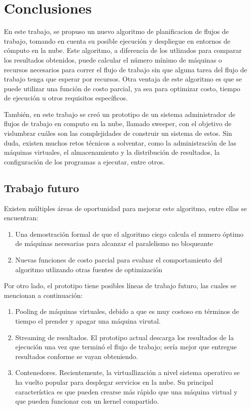 \chapter{Conclusiones}
\label{chap:conclusions}

En este trabajo, se propuso un nuevo algoritmo de planificacion de flujos de trabajo, tomando en cuenta su posible ejecución y despliegue en entornos de cómputo en la nube. Este algoritmo, a diferencia de los utlizados para comparar los resultados obtenidos, puede calcular el número mínimo de máquinas o recursos necesarios para correr el flujo de trabajo sin que alguna tarea del flujo de trabajo tenga que esperar por recursos. Otra ventaja de este algoritmo es que se puede utilizar una funci\'on de costo parcial, ya sea para optimizar costo, tiempo de ejecuci\'on u otros requisitos espec\'ificos.

Tambi\'en, en este trabajo se cre\'o un prototipo de un sistema administrador de flujos de trabajo en computo en la nube, llamado sweeper, con el objetivo de vislumbrar cu\'ales son las complejidades de construir un sistema de estos. Sin duda, existen muchos retos t\'ecnicos a solventar, como la administraci\'on de las m\'aquinas virtuales, el almacenamiento y la distribuci\'on de resultados, la configuraci\'on de los programas a ejecutar, entre otros.


\section{Trabajo futuro}

Existen múltiples áreas de oportunidad para mejorar este algoritmo, entre ellas se encuentran:

\begin{enumerate}
\item{Una demostraci\'on formal de que el algoritmo ciego calcula el numero \'optimo de m\'aquinas necesarias para alcanzar el paralelismo no bloqueante}
\item{Nuevas funciones de costo parcial para evaluar el comportamiento del algoritmo utlizando otras fuentes de optimizaci\'on}
\end{enumerate}

Por otro lado, el prototipo tiene posibles l\'ineas de trabajo futuro, las cuales se mencionan a continuaci\'on:

\begin{enumerate}
\item{Pooling de m\'aquinas virtuales, debido a que es muy costoso en t\'erminos de tiempo el prender y apagar una m\'aquina virutal.}
\item{Streaming de resultados. El prototipo actual descarga los resultados de la ejecuci\'on una vez que termin\'o el flujo de trabajo; ser\'ia mejor que entregue resultados conforme se vayan obteniendo.}
\item{Contenedores. Recientemente, la virtuallizaci\'on a nivel sistema operativo se ha vuelto popular para desplegar servicios en la nube. Su principal caracter\'istica es que pueden crearse m\'as r\'apido que una m\'aquina virtual y que pueden funcionar con un kernel compartido.}
\end{enumerate}
